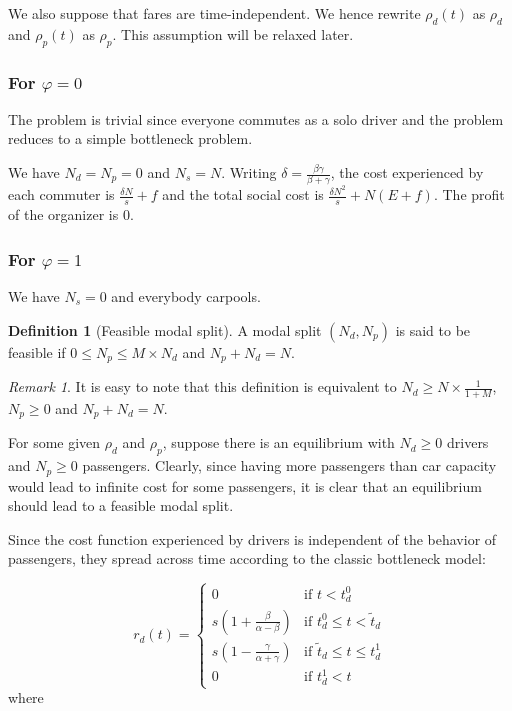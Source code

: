\documentclass[english, a4paper]{article}
\theoremstyle{plain}
\theoremstyle{definition}
\newtheorem{definition}{Definition}
\theoremstyle{remark}
\newtheorem{remark}{Remark}
\begin{document}
We also suppose that fares are time-independent. We hence rewrite $\rho _d(t)$ as $\rho _d$ and $\rho _p(t)$ as $\rho _p$. This assumption will be relaxed later.

\subsubsection{For $\varphi = 0$}

The problem is trivial since everyone commutes as a solo driver and the problem reduces to a simple bottleneck problem.

We have $N_d = N_p = 0$ and $N_s = N$. Writing $\delta = \frac{\beta \gamma}{\beta + \gamma}$, the cost experienced by each commuter is $\frac{\delta N}{s} + f$ and the total social cost is $\frac{\delta N^2}{s} + N(E + f)$. The profit of the organizer is $0$.

\subsubsection{For $\varphi = 1$}

We have $N_s = 0$ and everybody carpools.

\begin{definition}[Feasible modal split]
    A modal split $(N_d, N_p)$ is said to be feasible if $0 \leq N_p \leq M \times N_d$ and $N_p + N_d = N$.    
\end{definition}

\begin{remark}
    It is easy to note that this definition is equivalent to $N_d \geq N \times \frac{1}{1+M}$, $N_p \geq 0$ and $N_p + N_d = N$.
\end{remark}

For some given $\rho_d$ and $\rho_p$, suppose there is an equilibrium with $N_d \geq 0$ drivers and $N_p \geq 0$ passengers. Clearly, since having more passengers than car capacity would lead to infinite cost for some passengers, it is clear that an equilibrium should lead to a feasible modal split.

Since the cost function experienced by drivers is independent of the behavior of passengers, they spread across time according to the classic bottleneck model:

\begin{equation}
r_d(t) = \left\{
\begin{array}{lr}
    0 & \text{if } t<t_d^0\\
    s\left( 1 + \frac{\beta}{\alpha - \beta} \right) & \text{if } t_d^0 \leq t < \tilde{t}_d\\
    s\left( 1 - \frac{\gamma}{\alpha + \gamma} \right) & \text{if } \tilde{t}_d \leq t \leq t_d^1\\
    0 & \text{if } t_d^1 < t
\end{array}
\right.
\end{equation}
where
\end{document}

